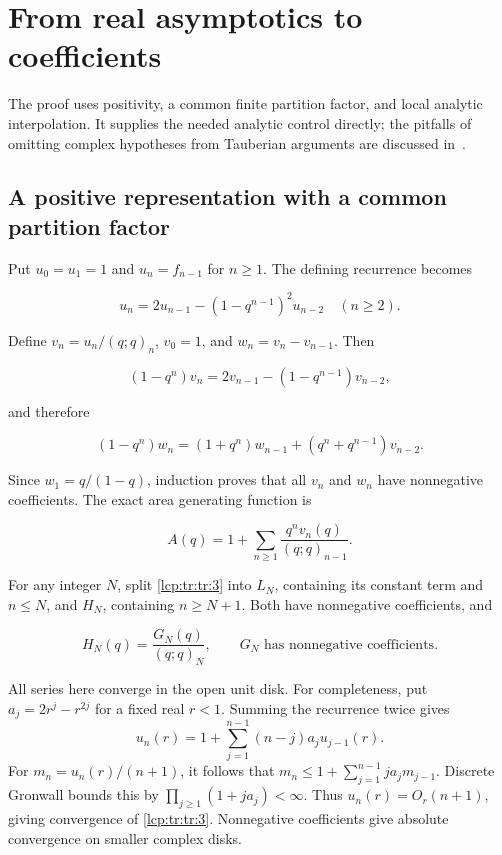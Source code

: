 \documentclass[11pt]{article}
\numberwithin{equation}{section}
\theoremstyle{definition}\newtheorem{definition}[theorem]{Definition}
\theoremstyle{remark}\newtheorem{remark}[theorem]{Remark}
\begin{document}
\section{From real asymptotics to coefficients}\label{lcp:tr:sec:transfer}
The proof uses positivity, a common finite partition factor, and local analytic interpolation. It supplies the needed analytic control directly; the pitfalls of omitting complex hypotheses from Tauberian arguments are discussed in~\cite{lcp-tr-bjm}.
\subsection{A positive representation with a common partition
factor}\label{lcp:tr:a-positive-representation-with-a-common-partition-factor}

Put \(u_0=u_1=1\) and \(u_n=f_{n-1}\) for \(n\ge1\). The defining
recurrence becomes

\[
u_n=2u_{n-1}-(1-q^{n-1})^2u_{n-2}\quad(n\ge2).
\]

Define \(v_n=u_n/(q;q)_n\), \(v_0=1\), and \(w_n=v_n-v_{n-1}\). Then

\[
(1-q^n)v_n=2v_{n-1}-(1-q^{n-1})v_{n-2},
\]

and therefore

\begin{equation}\label{lcp:tr:tr:2}
(1-q^n)w_n=(1+q^n)w_{n-1}+(q^n+q^{n-1})v_{n-2}.
\end{equation}

Since \(w_1=q/(1-q)\), induction proves that all \(v_n\) and \(w_n\)
have nonnegative coefficients. The exact area generating function is

\begin{equation}\label{lcp:tr:tr:3}
A(q)=1+\sum_{n\ge1}\frac{q^nv_n(q)}{(q;q)_{n-1}}.
\end{equation}

For any integer \(N\), split \eqref{lcp:tr:tr:3} into \(L_N\), containing its
constant term and \(n\le N\), and \(H_N\), containing \(n\ge N+1\). Both
have nonnegative coefficients, and

\begin{equation}\label{lcp:tr:tr:4}
H_N(q)=\frac{G_N(q)}{(q;q)_N},\qquad G_N\text{ has nonnegative coefficients}.
\end{equation}

All series here converge in the open unit disk. For completeness, put
\(a_j=2r^j-r^{2j}\) for a fixed real \(r<1\). Summing the recurrence
twice gives \[
u_n(r)=1+\sum_{j=1}^{n-1}(n-j)a_ju_{j-1}(r).
\] For \(m_n=u_n(r)/(n+1)\), it follows that
\(m_n\le1+\sum_{j=1}^{n-1}ja_jm_{j-1}\). Discrete Gronwall bounds this
by \(\prod_{j\ge1}(1+ja_j)<\infty\). Thus \(u_n(r)=O_r(n+1)\), giving
convergence of \eqref{lcp:tr:tr:3}. Nonnegative coefficients give absolute
convergence on smaller complex disks.
\end{document}
